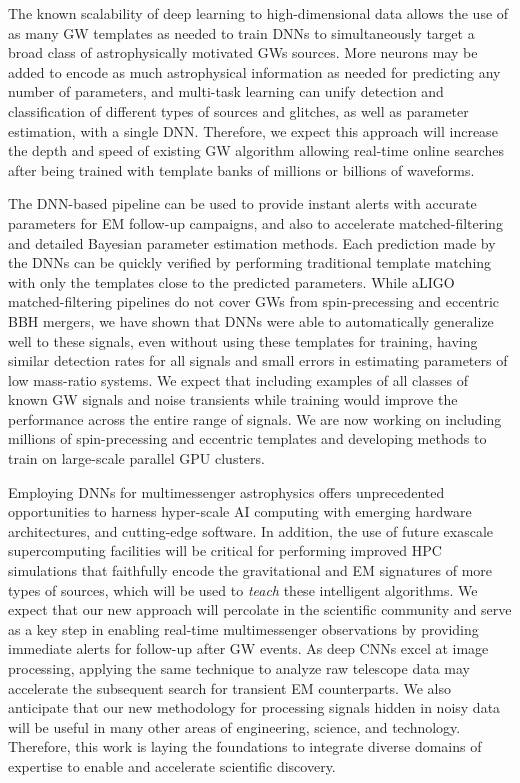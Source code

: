 \documentclass[aps,prd,%
amsmath,floats,floatfix, twocolumn, superscriptaddress,nofootinbib,showpacs]{revtex4-1}
\begin{document}
The known scalability of deep learning to high-dimensional data allows the use of as many GW templates as needed to train DNNs to simultaneously target a  broad class of astrophysically motivated GWs sources. More neurons may be added to encode as much astrophysical information as needed for predicting any number of parameters, and multi-task learning can unify detection and classification of different types of sources and glitches, as well as parameter estimation, with a single DNN. Therefore, we expect this approach will increase the depth and speed of existing GW algorithm allowing real-time online searches after being trained with template banks of millions or billions of waveforms.

The DNN-based pipeline can be used to provide instant alerts with accurate parameters for EM follow-up campaigns, and also to accelerate matched-filtering and detailed Bayesian parameter estimation methods. Each prediction made by the DNNs can be quickly verified by performing traditional template matching with only the templates close to the predicted parameters.  While aLIGO matched-filtering pipelines do not cover GWs from spin-precessing and eccentric BBH mergers, we have shown that DNNs were able to automatically generalize well to these signals, even without using these templates for training, having similar detection rates for all signals and small errors in estimating parameters of low mass-ratio systems. We expect that including examples of all classes of known GW signals and noise transients while training would improve the performance across the entire range of signals. We are now working on including millions of spin-precessing and eccentric templates and developing methods to train on large-scale parallel GPU clusters.

Employing DNNs for multimessenger astrophysics offers unprecedented opportunities to harness hyper-scale AI computing with emerging hardware architectures, and cutting-edge software. In addition, the use of future exascale supercomputing facilities will be critical for performing improved HPC simulations that faithfully encode the gravitational and EM signatures of more types of sources, which will be used to \textit{teach} these intelligent algorithms. We expect that our new approach will percolate in the scientific community and serve as a key step in enabling real-time multimessenger observations by providing immediate alerts for follow-up after GW events. As deep CNNs excel at image processing, applying the same technique to analyze raw telescope data may accelerate the subsequent search for transient EM counterparts. We also anticipate that our new methodology for processing signals hidden in noisy data will be useful in many other areas of engineering, science, and technology. Therefore, this work is laying the foundations to integrate diverse domains of expertise to enable and accelerate scientific discovery.
\end{document}
